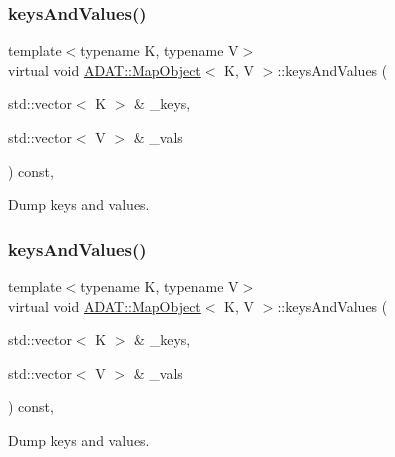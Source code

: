 \subsubsection{\texorpdfstring{keysAndValues()}{keysAndValues()}\hspace{0.1cm}{\footnotesize\ttfamily [1/3]}}
{\footnotesize\ttfamily template$<$typename K, typename V$>$ \\
virtual void \mbox{\hyperlink{classADAT_1_1MapObject}{A\+D\+A\+T\+::\+Map\+Object}}$<$ K, V $>$\+::keys\+And\+Values (\begin{DoxyParamCaption}\item[{std\+::vector$<$ K $>$ \&}]{\+\_\+keys,  }\item[{std\+::vector$<$ V $>$ \&}]{\+\_\+vals }\end{DoxyParamCaption}) const\hspace{0.3cm}{\ttfamily [inline]}, {\ttfamily [virtual]}}



Dump keys and values. 

\mbox{\label{classADAT_1_1MapObject_ab19c1622f3edfd0755e42583e6a48844}} 
\subsubsection{\texorpdfstring{keysAndValues()}{keysAndValues()}\hspace{0.1cm}{\footnotesize\ttfamily [2/3]}}
{\footnotesize\ttfamily template$<$typename K, typename V$>$ \\
virtual void \mbox{\hyperlink{classADAT_1_1MapObject}{A\+D\+A\+T\+::\+Map\+Object}}$<$ K, V $>$\+::keys\+And\+Values (\begin{DoxyParamCaption}\item[{std\+::vector$<$ K $>$ \&}]{\+\_\+keys,  }\item[{std\+::vector$<$ V $>$ \&}]{\+\_\+vals }\end{DoxyParamCaption}) const\hspace{0.3cm}{\ttfamily [inline]}, {\ttfamily [virtual]}}



Dump keys and values. 

